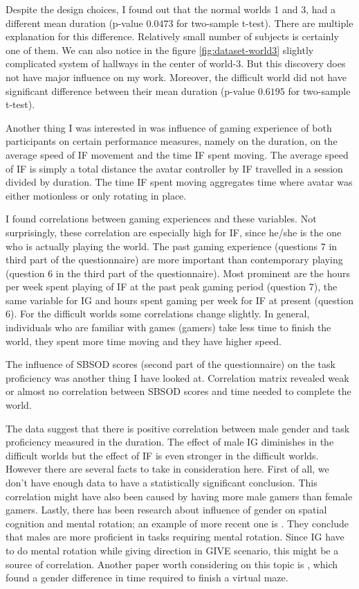 Despite the design choices, I found out that the normal worlds 1 and 3, had a different mean duration (p-value $0.0473$ for two-sample t-test). There are multiple explanation for this difference. Relatively small number of subjects is certainly one of them. We can also notice in the figure \ref{fig:dataset-world3} slightly complicated system of hallways in the center of world-3. But this discovery does not have major influence on my work. Moreover, the difficult world did not have significant difference between their mean duration (p-value $0.6195$ for two-sample t-test).

Another thing I was interested in was influence of gaming experience of both participants on certain performance measures, namely on the duration, on the average speed of IF movement and the time IF spent moving. The average speed of IF is simply a total distance the avatar controller by IF travelled in a session divided by duration. The time IF spent moving aggregates time where avatar was either motionless or only rotating in place. 

I found correlations between gaming experiences and these variables. Not surprisingly, these correlation are especially high for IF, since he/she is the one who is actually playing the world. The past gaming experience (questions 7 in third part of the questionnaire) are more important than contemporary playing (question 6 in the third part of the questionnaire). Most prominent are the hours per week spent playing of IF at the past peak gaming period (question 7), the same variable for IG and hours spent gaming per week for IF at present (question 6). For the difficult worlds some correlations change slightly. In general, individuals who are familiar with games (gamers) take less time to finish the world, they spent more time moving and they have higher speed.

The influence of SBSOD scores (second part of the questionnaire) on the task proficiency was another thing I have looked at. Correlation matrix revealed weak or almost no correlation between SBSOD scores and time needed to complete the world.

The data suggest that there is positive correlation between male gender and task proficiency measured in the duration. The effect of male IG diminishes in the difficult worlds but the effect of IF is even stronger in the difficult worlds. However there are several facts to take in consideration here. First of all, we don't have enough data to have a statistically significant conclusion. This correlation might have also been caused by having more male gamers than female gamers. Lastly, there has been research about influence of gender on spatial cognition and mental rotation; an example of more recent one is \citep{geary2000sex}. They conclude that males are more proficient in tasks requiring mental rotation. Since IG have to do mental rotation while giving direction in GIVE scenario, this might be a source of correlation. Another paper worth considering on this topic is \citep{moffat1998navigation}, which found a gender difference in time required to finish a virtual maze.

